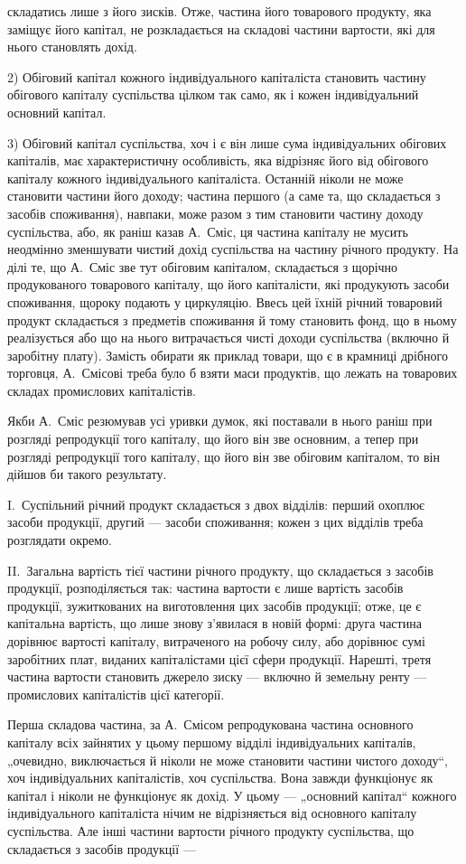 \parcont{}  %
складатись лише з його зисків. Отже, частина його товарового продукту,
яка заміщує його капітал, не розкладається на складові частини вартости,
які для нього становлять дохід.

2) Обіговий капітал кожного індивідуального капіталіста становить
частину обігового капіталу суспільства цілком так само, як і кожен індивідуальний
основний капітал.

3) Обіговий капітал суспільства, хоч і є він лише сума індивідуальних
обігових капіталів, має характеристичну особливість, яка відрізняє
його від обігового капіталу кожного індивідуального капіталіста. Останній
ніколи не може становити частини його доходу; частина першого
(а саме та, що складається з засобів споживання), навпаки, може разом
з тим становити частину доходу суспільства, або, як раніш казав
А.~Сміс, ця частина капіталу не мусить неодмінно зменшувати чистий
дохід суспільства на частину річного продукту. На ділі те, що А.~Сміс
зве тут обіговим капіталом, складається з щорічно продукованого товарового
капіталу, що його капіталісти, які продукують засоби споживання,
щороку подають у циркуляцію. Ввесь цей їхній річний товаровий продукт
складається з предметів споживання й тому становить фонд, що в ньому
реалізується або що на нього витрачається чисті доходи суспільства (включно
й заробітну плату). Замість обирати як приклад товари, що є в крамниці
дрібного торговця, А.~Смісові треба було б взяти маси продуктів, що
лежать на товарових складах промислових капіталістів.

Якби А.~Сміс резюмував усі уривки думок, які поставали в нього
раніш при розгляді репродукції того капіталу, що його він зве основним,
а тепер при розгляді репродукції того капіталу, що його він зве
обіговим капіталом, то він дійшов би такого результату.

I.~Суспільний річний продукт складається з двох відділів: перший
охоплює засоби продукції, другий — засоби споживання; кожен з цих
відділів треба розглядати окремо.

II.~Загальна вартість тієї частини річного продукту, що складається
з засобів продукції, розподіляється так: частина вартости є
лише вартість засобів продукції, зужиткованих на виготовлення цих засобів
продукції; отже, це є капітальна вартість, що лише знову з’явилася
в новій формі: друга частина дорівнює вартості капіталу, витраченого
на робочу силу, або дорівнює сумі заробітних плат, виданих капіталістами
цієї сфери продукції. Нарешті, третя частина вартости становить
джерело зиску — включно й земельну ренту — промислових капіталістів
цієї категорії.

Перша складова частина, за А.~Смісом репродукована частина основного
капіталу всіх зайнятих у цьому першому відділі індивідуальних
капіталів, „очевидно, виключається й ніколи не може становити частини
чистого доходу“, хоч індивідуальних капіталістів, хоч суспільства. Вона
завжди функціонує як капітал і ніколи не функціонує як дохід. У цьому
— „основний капітал“ кожного індивідуального капіталіста нічим не
відрізняється від основного капіталу суспільства. Але інші частини вартости
річного продукту суспільства, що складається з засобів продукції —
\parbreak{}  %
